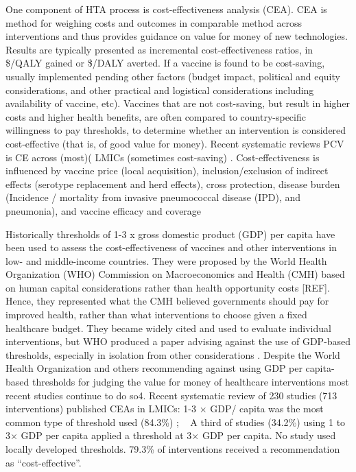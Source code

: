 \documentclass[12pt]{article}
\begin{document}
One component of HTA process is cost-effectiveness analysis (CEA). CEA is method for weighing costs and outcomes in comparable method across interventions and thus provides guidance on value for money of new technologies. Results are typically presented as incremental cost-effectiveness ratios, in \$/QALY gained or \$/DALY averted. If a vaccine is found to be cost-saving, usually implemented pending other factors (budget impact, political and equity considerations, and other practical and logistical considerations including availability of vaccine, etc). Vaccines that are not cost-saving, but result in higher costs and higher health benefits, are often compared to country-specific willingness to pay thresholds, to determine whether an intervention is considered cost-effective (that is, of good value for money). Recent systematic reviews PCV is CE across (most)( LMICs (sometimes cost-saving) \autocite{saokaew_cost_2016, syeed_pneumococcal_2023, wang_systematic_2022, zakiyah_pneumococcal_2020}. Cost-effectiveness is influenced by vaccine price (local acquisition), inclusion/exclusion of indirect effects (serotype replacement and herd effects), cross protection, disease burden (Incidence / mortality from invasive pneumococcal disease (IPD), and pneumonia), and vaccine efficacy and coverage

Historically thresholds of 1-3 x gross domestic product (GDP) per capita have been used to assess the cost-effectiveness of vaccines and other interventions in low- and middle-income countries. They were proposed by the World Health Organization (WHO) Commission on Macroeconomics and Health (CMH) based on human capital considerations rather than health opportunity costs [REF]. Hence, they represented what the CMH believed governments should pay for improved health, rather than what interventions to choose given a fixed healthcare budget. They became widely cited and used to evaluate individual interventions, but WHO produced a paper advising against the use of GDP-based thresholds, especially in isolation from other considerations \autocite{bertram_costeffectiveness_2016}. Despite the World Health Organization and others recommending against using GDP per capita-based thresholds for judging the value for money of healthcare interventions most recent studies continue to do so4. Recent systematic review of 230 studies (713 interventions) published CEAs in LMICs: 1-3 × GDP/ capita was the most common type of threshold used (84.3\%) ; ~ A third of studies (34.2\%) using 1 to 3× GDP per capita applied a threshold at 3× GDP per capita. No study used locally developed thresholds. 79.3\% of interventions received a recommendation as “cost-effective”.
\end{document}
